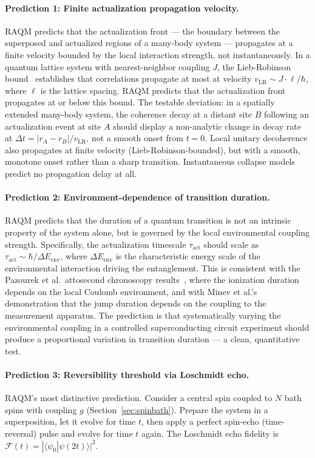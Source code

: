 \documentclass[11pt,a4paper]{article}
\theoremstyle{plain}
\theoremstyle{definition}
\theoremstyle{remark}
\begin{document}
\paragraph{Prediction 1: Finite actualization propagation velocity.}
RAQM predicts that the actualization front --- the boundary between the superposed
and actualized regions of a many-body system --- propagates at a finite velocity
bounded by the local interaction strength, not instantaneously. In a quantum
lattice system with nearest-neighbor coupling $J$, the Lieb-Robinson
bound~\citep{LiebRobinson1972} establishes that correlations propagate at most at
velocity $v_{\mathrm{LR}} \sim J \cdot \ell / \hbar$, where $\ell$ is the lattice
spacing. RAQM predicts that the actualization front propagates at or below this
bound. The testable deviation: in a spatially extended many-body system, the
coherence decay at a distant site $B$ following an actualization event at
site $A$ should display a non-analytic change in decay rate at
$\Delta t = |r_A - r_B| / v_{\mathrm{LR}}$, not a smooth onset from
$t = 0$. Local unitary decoherence also propagates at finite velocity
(Lieb-Robinson-bounded), but with a smooth, monotone onset rather than
a sharp transition. Instantaneous collapse models predict no propagation
delay at all.

\paragraph{Prediction 2: Environment-dependence of transition duration.}
RAQM predicts that the duration of a quantum transition is not an intrinsic
property of the system alone, but is governed by the local environmental coupling
strength. Specifically, the actualization timescale $\tau_{\mathrm{act}}$ should
scale as $\tau_{\mathrm{act}} \sim \hbar / \Delta E_{\mathrm{env}}$, where
$\Delta E_{\mathrm{env}}$ is the characteristic energy scale of the environmental
interaction driving the entanglement. This is consistent with the Pazourek et al.\
attosecond chronoscopy results~\citep{Pazourek2015}, where the ionization duration
depends on the local Coulomb environment, and with Minev et al.'s demonstration
that the jump duration depends on the coupling to the measurement apparatus. The
prediction is that systematically varying the environmental coupling in a controlled
superconducting circuit experiment should produce a proportional variation in
transition duration --- a clean, quantitative test.

\paragraph{Prediction 3: Reversibility threshold via Loschmidt echo.}
\label{pred:P3}
RAQM's most distinctive prediction. Consider a central spin coupled to
$N$ bath spins with coupling $g$ (Section~\ref{sec:spinbath}). Prepare the
system in a superposition, let it evolve for time $t$, then apply a
perfect spin-echo (time-reversal) pulse and evolve for time $t$ again.
The Loschmidt echo fidelity is
$\mathcal{F}(t) = |\langle\psi_0|\psi(2t)\rangle|^2$.
\end{document}
